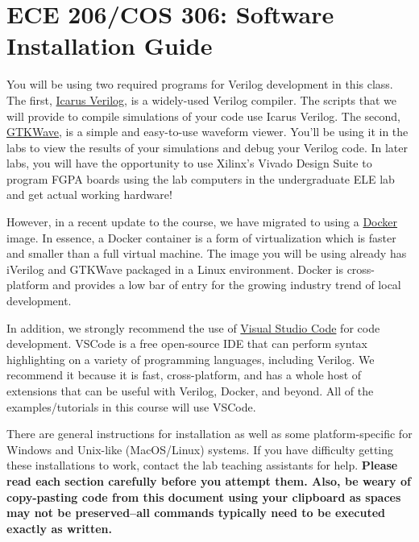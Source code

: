 \documentclass[11pt, letterpaper, titlepage, oneside]{memoir}
\begin{document}
\mainmatter

\chapter*{ECE 206/COS 306: \newline Software Installation Guide}
	You will be using two required programs for Verilog development
	in this class. The first,
	\href{http://iverilog.icarus.com/}{Icarus Verilog}, is a widely-used
	Verilog compiler. The scripts that we will provide to compile simulations
	of your code use Icarus Verilog. The second,
	\href{http://gtkwave.sourceforge.net/}{GTKWave}, is a simple and
	easy-to-use waveform viewer. You'll be using it in the labs to view the
	results of your simulations and debug your Verilog code. 
	In later labs, you will have the opportunity to use
	Xilinx's Vivado Design Suite to program FGPA boards using the
	lab computers in the undergraduate ELE lab and get actual working hardware!
	
	However, in a recent update to the course, we have migrated to using a \href{https://www.docker.com/resources/what-container}{Docker} image. In essence, a Docker container is a form of virtualization which is faster and smaller than a full virtual machine. The image you will be using already has iVerilog and GTKWave packaged in a Linux environment. Docker is cross-platform and provides a low bar of entry for the growing industry trend of local development.

	In addition, we strongly recommend the use of
	\href{https://code.visualstudio.com/}{Visual Studio Code} for code
	development. VSCode is a free open-source IDE that can perform syntax
	highlighting on a variety of programming languages, including Verilog. We
	recommend it because it is fast, cross-platform, and has a whole host of extensions that can be useful with Verilog, Docker, and beyond.
	All of the examples/tutorials in this course will use VSCode.
    
	There are general instructions for installation as well as some platform-specific for Windows and Unix-like (MacOS/Linux) systems. If you have difficulty getting these installations to work, contact the lab teaching assistants for help. \textbf{Please read each section carefully before you attempt them. Also, be weary of copy-pasting code from this document using your clipboard as spaces may not be preserved--all commands typically need to be executed exactly as written.}
\end{document}
